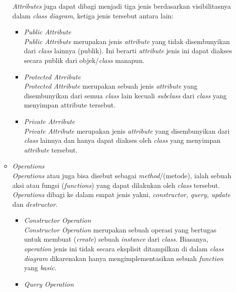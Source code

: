 \documentclass[a4paper]{article}
\begin{document}
\begin{enumerate}
\begin{itemize}
        \textit{Attributes} juga dapat dibagi menjadi tiga jenis berdasarkan visibilitasnya dalam \textit{class diagram}, ketiga jenis tersebut antara lain:
        \begin{itemize}
            \item \textit{Public Attribute}\\
            \textit{Public Attribute} merupakan jenis \textit{attribute} yang tidak disembunyikan dari \textit{class} lainnya (publik). Ini berarti \textit{attribute} jenis ini dapat diakses secara publik dari objek/\textit{class} manapun\autocite{systemanalysisdesign-class-diagram}.
            \item \textit{Protected Atrribute}\\
            \textit{Protected Attribute} merupakan sebuah jenis \textit{attribute} yang disembunyikan dari semua \textit{class} lain kecuali \textit{subclass} dari \textit{class} yang menyimpan attribute tersebut\autocite{systemanalysisdesign-class-diagram}.
            \item \textit{Private Atrribute}\\
            \textit{Private Attribute} merupakan jenis \textit{attribute} yang disembunyikan dari \textit{class} lainnya dan hanya dapat diakses oleh \textit{class} yang menyimpan \textit{attribute} tersebut\autocite{systemanalysisdesign-class-diagram}.
        \end{itemize}
        \item \textit{Operations}\\
        \textit{Operations} atau juga bisa disebut sebagai \textit{method}/(metode), ialah sebuah aksi atau fungsi (\textit{functions}) yang dapat dilakukan oleh \textit{class} tersebut. \textit{Operations} dibagi ke dalam empat jenis yakni, \textit{constructor, query, update} dan \textit{destructor}\autocite{systemanalysisdesign-class-diagram}.
        \begin{itemize}
            \item \textit{Constructor Operation}\\
            \textit{Constructor Operation} merupakan sebuah operasi yang bertugas untuk membuat (\textit{create}) sebuah \textit{instance} dari \textit{class}. Biasanya, \textit{operation} jenis ini tidak secara eksplisit ditampilkan di dalam \textit{class diagram} dikarenakan hanya mengimplementasikan sebuah \textit{function} yang \textit{basic}\autocite{systemanalysisdesign-class-diagram}.
            \item \textit{Query Operation}\\

\end{itemize}
\end{itemize}
\end{enumerate}
\end{document}
